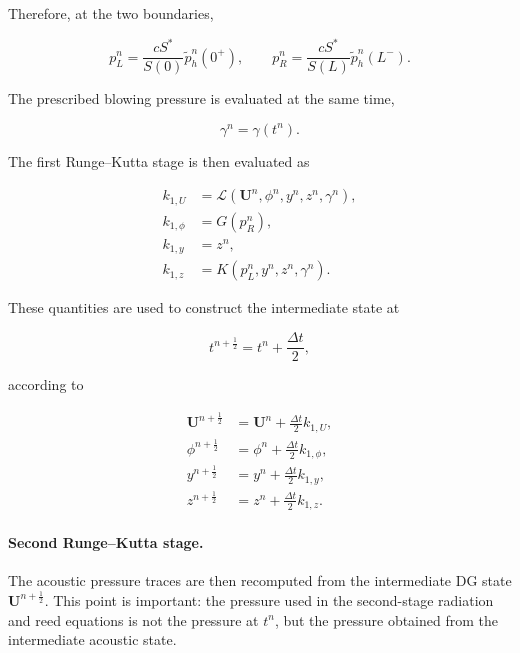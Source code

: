 \documentclass[11pt,a4paper]{report}
\theoremstyle{plain}
\theoremstyle{definition}
\begin{document}
Therefore, at the two boundaries,

\begin{equation}
p_L^n
=
\frac{cS^\ast}{S(0)}
\tilde p_h^n(0^+),
\qquad
p_R^n
=
\frac{cS^\ast}{S(L)}
\tilde p_h^n(L^-).
\label{eq:pressure_stage1}
\end{equation}

The prescribed blowing pressure is evaluated at the same time,

\begin{equation}
\gamma^n=\gamma(t^n).
\end{equation}

The first Runge--Kutta stage is then evaluated as

\begin{subequations}
\label{eq:rk2_stage1}
\begin{align}
k_{1,U}
&=
\mathcal L
\left(
\mathbf U^n,
\phi^n,
y^n,
z^n,
\gamma^n
\right),
\\
k_{1,\phi}
&=
G(p_R^n),
\\
k_{1,y}
&=
z^n,
\\
k_{1,z}
&=
K
\left(
p_L^n,
y^n,
z^n,
\gamma^n
\right).
\end{align}
\end{subequations}

These quantities are used to construct the intermediate state at

\begin{equation}
t^{n+\frac12}
=
t^n+\frac{\Delta t}{2},
\end{equation}

according to

\begin{subequations}
\label{eq:rk2_midpoint}
\begin{align}
\mathbf U^{n+\frac12}
&=
\mathbf U^n
+
\frac{\Delta t}{2}k_{1,U},
\\
\phi^{n+\frac12}
&=
\phi^n
+
\frac{\Delta t}{2}k_{1,\phi},
\\
y^{n+\frac12}
&=
y^n
+
\frac{\Delta t}{2}k_{1,y},
\\
z^{n+\frac12}
&=
z^n
+
\frac{\Delta t}{2}k_{1,z}.
\end{align}
\end{subequations}

\paragraph{Second Runge--Kutta stage.}

The acoustic pressure traces are then recomputed from the intermediate DG
state \(\mathbf U^{n+\frac12}\). This point is important: the pressure used
in the second-stage radiation and reed equations is not the pressure at
\(t^n\), but the pressure obtained from the intermediate acoustic state.
\end{document}
